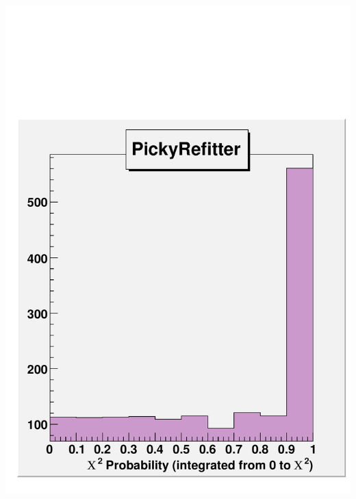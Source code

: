 \documentclass[compress]{beamer}
\begin{document}
\begin{frame}
\vfill
\begin{columns}
\includegraphics[width=\linewidth]{probability_picky.pdf}

\end{columns}
\end{frame}
\end{document}
